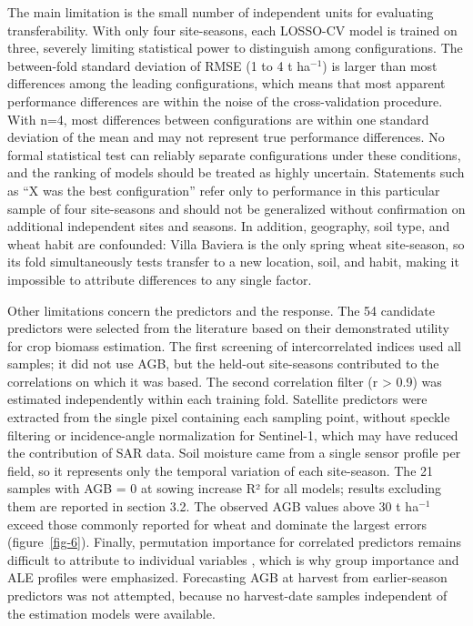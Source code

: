 \documentclass[
  british,
]{interact}
\begin{document}
The main limitation is the small number of independent units for
evaluating transferability. With only four site-seasons, each LOSSO-CV
model is trained on three, severely limiting statistical power to
distinguish among configurations. The between-fold standard deviation of
RMSE (1 to 4 t ha\(^{-1}\)) is larger than most differences among the
leading configurations, which means that most apparent performance
differences are within the noise of the cross-validation procedure. With
n=4, most differences between configurations are within one standard
deviation of the mean and may not represent true performance
differences. No formal statistical test can reliably separate
configurations under these conditions, and the ranking of models should
be treated as highly uncertain. Statements such as ``X was the best
configuration'' refer only to performance in this particular sample of
four site-seasons and should not be generalized without confirmation on
additional independent sites and seasons. In addition, geography, soil
type, and wheat habit are confounded: Villa Baviera is the only spring
wheat site-season, so its fold simultaneously tests transfer to a new
location, soil, and habit, making it impossible to attribute differences
to any single factor.

Other limitations concern the predictors and the response. The 54
candidate predictors were selected from the literature based on their
demonstrated utility for crop biomass estimation. The first screening of
intercorrelated indices used all samples; it did not use AGB, but the
held-out site-seasons contributed to the correlations on which it was
based. The second correlation filter (r \textgreater{} 0.9) was
estimated independently within each training fold. Satellite predictors
were extracted from the single pixel containing each sampling point,
without speckle filtering or incidence-angle normalization for
Sentinel-1, which may have reduced the contribution of SAR data. Soil
moisture came from a single sensor profile per field, so it represents
only the temporal variation of each site-season. The 21 samples with AGB
= 0 at sowing increase R² for all models; results excluding them are
reported in section 3.2. The observed AGB values above 30 t ha\(^{-1}\)
exceed those commonly reported for wheat and dominate the largest errors
(figure~\ref{fig-6}). Finally, permutation importance for correlated
predictors remains difficult to attribute to individual variables
\citep{Strobl2008}, which is why group importance and ALE profiles were
emphasized. Forecasting AGB at harvest from earlier-season predictors
was not attempted, because no harvest-date samples independent of the
estimation models were available.
\end{document}
